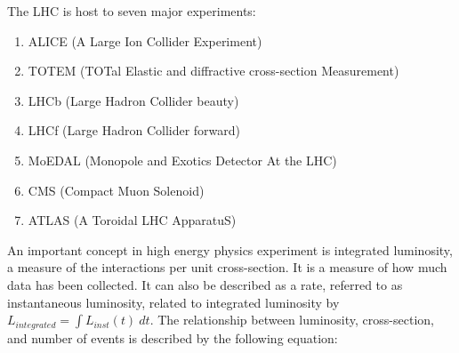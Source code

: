 The LHC is host to seven major experiments:
\begin{enumerate}%
\item ALICE (A Large Ion Collider Experiment) ~\cite{ALICE}
\item TOTEM (TOTal Elastic and diffractive cross-section Measurement) ~\cite{TOTEM}
\item LHCb (Large Hadron Collider beauty)~\cite{LHCb}
\item LHCf (Large Hadron Collider forward)~\cite{LHCf}
\item MoEDAL (Monopole and Exotics Detector At the LHC) ~\cite{MoEDAL}
\item CMS (Compact Muon Solenoid)~\cite{CMS} 
\item ATLAS (A Toroidal LHC ApparatuS)
\end{enumerate}


An important concept in high energy physics experiment is integrated luminosity, a measure of the interactions per unit cross-section. It is a measure of how much data has been collected. It can also be described as a rate, referred to as instantaneous luminosity, related to integrated luminosity by $L_{integrated}=\int L_{inst}(t)\ dt$. The relationship between luminosity, cross-section, and number of events is described by the following equation:

